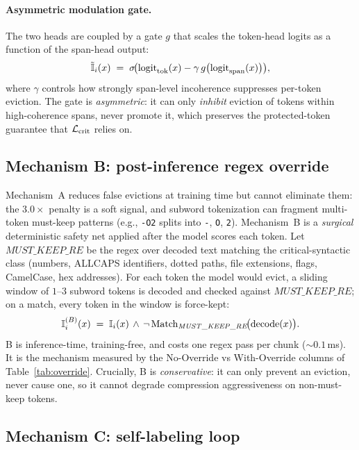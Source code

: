 \paragraph{Asymmetric modulation gate.} The two heads are coupled by a gate
$g$ that scales the token-head logits as a function of the span-head output:
\[
  \tilde{\mathbb{I}}_i(x)
  \;=\;
  \sigma\!\bigl(\mathrm{logit}_{\mathrm{tok}}(x)
                - \gamma\, g\bigl(\mathrm{logit}_{\mathrm{span}}(x)\bigr)\bigr),
\]
where $\gamma$ controls how strongly span-level incoherence suppresses
per-token eviction. The gate is \emph{asymmetric}: it can only \emph{inhibit}
eviction of tokens within high-coherence spans, never promote it, which
preserves the protected-token guarantee that $\mathcal{L}_{\mathrm{crit}}$ relies on.

\subsection{Mechanism B: post-inference regex override}
\label{sec:override}

Mechanism~A reduces false evictions at training time but cannot eliminate
them: the $3.0\times$ penalty is a soft signal, and subword tokenization can
fragment multi-token must-keep patterns (e.g., \texttt{-O2} splits into
\texttt{-}, \texttt{O}, \texttt{2}). Mechanism~B is a \emph{surgical}
deterministic safety net applied after the model scores each token. Let
$\mathit{MUST\_KEEP\_RE}$ be the regex over decoded text matching the
critical-syntactic class (numbers, ALLCAPS identifiers, dotted paths, file
extensions, flags, CamelCase, hex addresses). For each token the model would
evict, a sliding window of $1$--$3$ subword tokens is decoded and checked
against $\mathit{MUST\_KEEP\_RE}$; on a match, every token in the window is
force-kept:
\[
  \mathbb{I}^{(B)}_i(x)
  \;=\;
  \mathbb{I}_i(x)\,\wedge\,\neg\,\mathrm{Match}_{\mathit{MUST\_KEEP\_RE}}\!\bigl(\mathrm{decode}(x)\bigr).
\]
B is inference-time, training-free, and costs one regex pass per chunk
(${\sim}0.1$\,ms). It is the mechanism measured by the No-Override vs
With-Override columns of Table~\ref{tab:override}. Crucially, B is
\emph{conservative}: it can only prevent an eviction, never cause one, so it
cannot degrade compression aggressiveness on non-must-keep tokens.

\subsection{Mechanism C: self-labeling loop}
\label{sec:selflabel}

